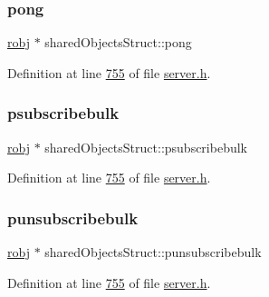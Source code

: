 \mbox{\label{structsharedObjectsStruct_af1b3c4f0f52a03a86212fea8862131ff}} 
\subsubsection{\texorpdfstring{pong}{pong}}
{\footnotesize\ttfamily \hyperlink{structredisObject}{robj} $\ast$ shared\+Objects\+Struct\+::pong}



Definition at line \hyperlink{server_8h_source_l00755}{755} of file \hyperlink{server_8h_source}{server.\+h}.

\mbox{\label{structsharedObjectsStruct_aca1453b5caf7889aa4e8fef80e955b5e}} 
\subsubsection{\texorpdfstring{psubscribebulk}{psubscribebulk}}
{\footnotesize\ttfamily \hyperlink{structredisObject}{robj} $\ast$ shared\+Objects\+Struct\+::psubscribebulk}



Definition at line \hyperlink{server_8h_source_l00755}{755} of file \hyperlink{server_8h_source}{server.\+h}.

\mbox{\label{structsharedObjectsStruct_a0252fba47352c043f23c8047b9f4a8b1}} 
\subsubsection{\texorpdfstring{punsubscribebulk}{punsubscribebulk}}
{\footnotesize\ttfamily \hyperlink{structredisObject}{robj} $\ast$ shared\+Objects\+Struct\+::punsubscribebulk}



Definition at line \hyperlink{server_8h_source_l00755}{755} of file \hyperlink{server_8h_source}{server.\+h}.

